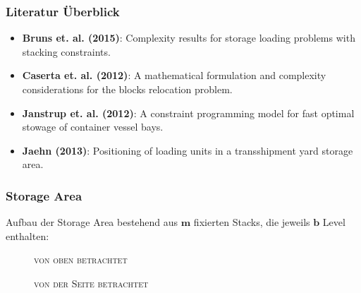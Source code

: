 \documentclass{beamer}
\begin{document}
\begin{frame}
\frametitle{Literatur Überblick}

\begin{itemize}
  \item \textbf{Bruns et. al. (2015)}: Complexity results for storage loading problems with stacking constraints.
  \item \textbf{Caserta et. al. (2012)}: A mathematical formulation and complexity considerations for the blocks relocation problem.
  \item \textbf{Janstrup et. al. (2012)}: A constraint programming model for fast optimal stowage of container vessel bays.
  \item \textbf{Jaehn (2013)}: Positioning of loading units in a transshipment yard storage area.
\end{itemize}

\end{frame}

\begin{frame}
\frametitle{Storage Area}
Aufbau der Storage Area bestehend aus $\boldsymbol{m}$ fixierten Stacks, die jeweils $\boldsymbol{b}$ Level enthalten:\newline

\begin{figure}[H]
\centering
{}
\caption*{\textsc{von oben betrachtet}}
\end{figure}

\begin{figure}[H]
\centering
{}
\caption*{\textsc{von der Seite betrachtet}}
\end{figure}
\end{frame}
\end{document}
